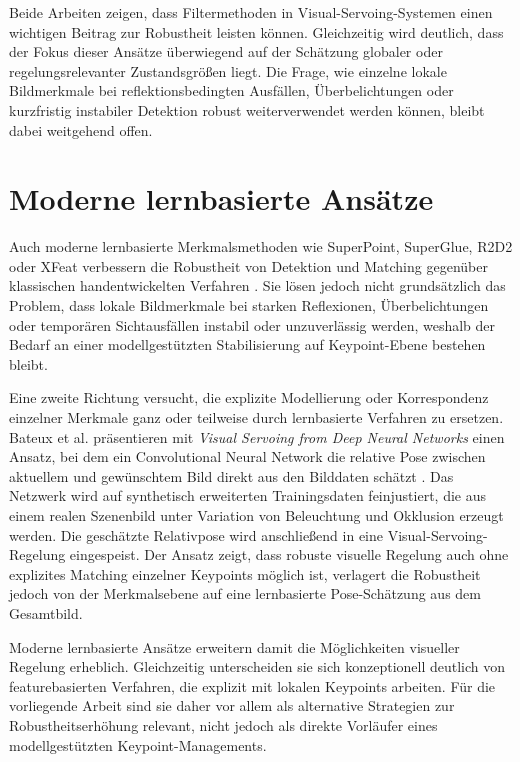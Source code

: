 Beide Arbeiten zeigen, dass Filtermethoden in Visual-Servoing-Systemen einen wichtigen Beitrag zur Robustheit leisten können. Gleichzeitig wird deutlich, dass der Fokus dieser Ansätze überwiegend auf der Schätzung globaler oder regelungsrelevanter Zustandsgrößen liegt. Die Frage, wie einzelne lokale Bildmerkmale bei reflektionsbedingten Ausfällen, Überbelichtungen oder kurzfristig instabiler Detektion robust weiterverwendet werden können, bleibt dabei weitgehend offen.

\section{Moderne lernbasierte Ansätze}
\label{sec:modern_learning_based_related}

Auch moderne lernbasierte Merkmalsmethoden wie SuperPoint, SuperGlue, R2D2 oder XFeat verbessern die Robustheit von Detektion und Matching gegenüber klassischen handentwickelten Verfahren \cite{potje2024xfeat, detone2018superpoint, sarlin2020superglue, revaud2019r2d2}. Sie lösen jedoch nicht grundsätzlich das Problem, dass lokale Bildmerkmale bei starken Reflexionen, Überbelichtungen oder temporären Sichtausfällen instabil oder unzuverlässig werden, weshalb der Bedarf an einer modellgestützten Stabilisierung auf Keypoint-Ebene bestehen bleibt.

Eine zweite Richtung versucht, die explizite Modellierung oder Korrespondenz einzelner Merkmale ganz oder teilweise durch lernbasierte Verfahren zu ersetzen. Bateux et al. präsentieren mit \textit{Visual Servoing from Deep Neural Networks} einen Ansatz, bei dem ein Convolutional Neural Network die relative Pose zwischen aktuellem und gewünschtem Bild direkt aus den Bilddaten schätzt \cite{bateux2017visual}. Das Netzwerk wird auf synthetisch erweiterten Trainingsdaten feinjustiert, die aus einem realen Szenenbild unter Variation von Beleuchtung und Okklusion erzeugt werden. Die geschätzte Relativpose wird anschließend in eine Visual-Servoing-Regelung eingespeist. Der Ansatz zeigt, dass robuste visuelle Regelung auch ohne explizites Matching einzelner Keypoints möglich ist, verlagert die Robustheit jedoch von der Merkmalsebene auf eine lernbasierte Pose-Schätzung aus dem Gesamtbild.

Moderne lernbasierte Ansätze erweitern damit die Möglichkeiten visueller Regelung erheblich. Gleichzeitig unterscheiden sie sich konzeptionell deutlich von featurebasierten Verfahren, die explizit mit lokalen Keypoints arbeiten. Für die vorliegende Arbeit sind sie daher vor allem als alternative Strategien zur Robustheitserhöhung relevant, nicht jedoch als direkte Vorläufer eines modellgestützten Keypoint-Managements.

